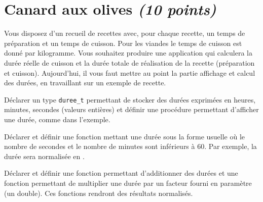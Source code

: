 \section{Canard aux olives \emph{(10 points)}}
Vous disposez d'un recueil de recettes avec, pour chaque recette, un
temps de préparation et un temps de cuisson. Pour les viandes le temps
de cuisson est donné par kilogramme. Vous souhaitez produire une application
qui calculera la durée réelle de cuisson et la durée totale de 
réalisation de la recette (préparation et cuisson). Aujourd'hui, il
vous faut mettre au point la partie affichage et calcul des durées, en
travaillant sur un exemple de recette.

\question Déclarer un type \verb+duree_t+ permettant de stocker des
durées exprimées en heures, minutes, secondes (valeurs entières) et
définir une procédure  permettant d'afficher une durée, comme dans l'exemple.

\question Déclarer et définir une fonction  mettant une durée sous la forme usuelle où le nombre de secondes et le nombre de minutes sont inférieurs à 60. Par exemple, la durée  sera normalisée en .

\question Déclarer et définir une fonction   permettant d'additionner des durées et une fonction  permettant de multiplier une durée par un  facteur fourni en paramètre (un double). Ces fonctions rendront des résultats normalisés.

